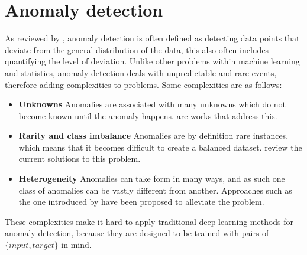 \section{Anomaly detection}
\label{sec:anomaly_detection}
As reviewed by \textcite{anomaly_detection}, anomaly detection is often defined as detecting data points that deviate from the general distribution of the data, this also often includes quantifying the level of deviation. Unlike other problems within machine learning and statistics, anomaly detection deals with unpredictable and rare events, therefore adding complexities to problems. Some complexities are as follows:
\begin{itemize}
    \item \textbf{Unknowns} Anomalies are associated with many unknowns which do not become known until the anomaly happens. \textcite{unknown_detection1,unknown_detection2} are works that address this.
    \item \textbf{Rarity and class imbalance} Anomalies are by definition rare instances, which means that it becomes difficult to create a balanced dataset. \textcite{class_imbalance1} review the current solutions to this problem.
    \item \textbf{Heterogeneity} Anomalies can take form in many ways, and as such one class of anomalies can be vastly different from another. Approaches such as the one introduced by \textcite{heterogeneous1} have been proposed to alleviate the problem.
\end{itemize}
These complexities make it hard to apply traditional deep learning methods for anomaly detection, because they are designed to be trained with pairs of $\{input, target\}$ in mind.
